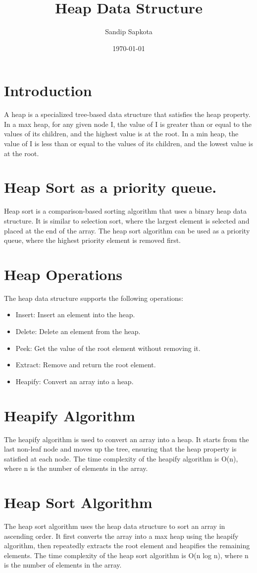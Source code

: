 \documentclass{article}
\title{Heap Data Structure}
\author{Sandip Sapkota}
\date{\today}
\begin{document}
\maketitle

\section*{Introduction}
A heap is a specialized tree-based data structure that satisfies the heap property. In a max heap, for any given node I, the value of I is greater than or equal to the values of its children, and the highest value is at the root. In a min heap, the value of I is less than or equal to the values of its children, and the lowest value is at the root.
\section*{Heap Sort as a priority queue. }
Heap sort is a comparison-based sorting algorithm that uses a binary heap data structure. It is similar to selection sort, where the largest element is selected and placed at the end of the array. The heap sort algorithm can be used as a priority queue, where the highest priority element is removed first.
\section*{Heap Operations}
The heap data structure supports the following operations:
\begin{itemize}
    \item Insert: Insert an element into the heap.
    \item Delete: Delete an element from the heap.
    \item Peek: Get the value of the root element without removing it.
    \item Extract: Remove and return the root element.
    \item Heapify: Convert an array into a heap.
\end{itemize}
\section*{Heapify Algorithm}
The heapify algorithm is used to convert an array into a heap. It starts from the last non-leaf node and moves up the tree, ensuring that the heap property is satisfied at each node. The time complexity of the heapify algorithm is O(n), where n is the number of elements in the array.
\section*{Heap Sort Algorithm}
The heap sort algorithm uses the heap data structure to sort an array in ascending order. It first converts the array into a max heap using the heapify algorithm, then repeatedly extracts the root element and heapifies the remaining elements. The time complexity of the heap sort algorithm is O(n log n), where n is the number of elements in the array.
\end{document}
